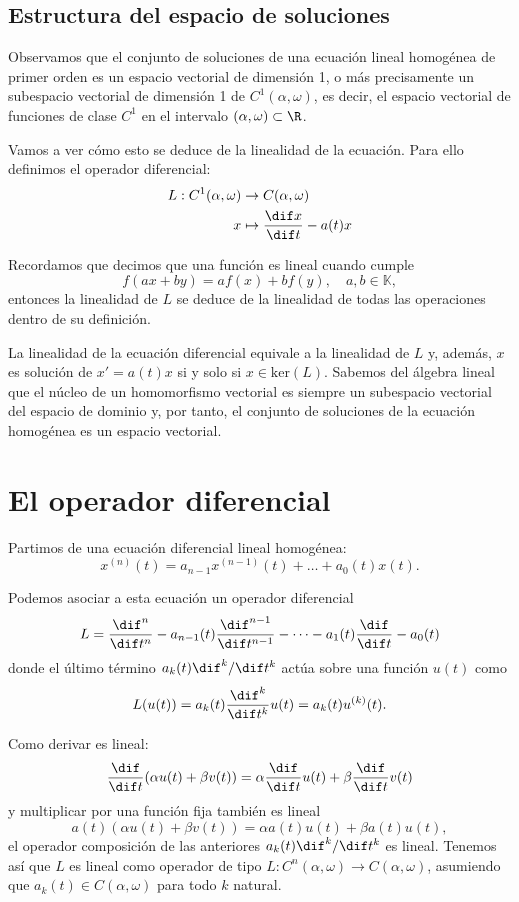 \documentclass[../main.tex]{subfiles}
\begin{document}
\subsection{Estructura del espacio de soluciones}

Observamos que el conjunto de soluciones de una ecuación lineal homogénea de
primer orden es un espacio vectorial de dimensión 1, o más precisamente un
subespacio vectorial de dimensión 1 de \(C^1(\alpha, \omega)\), es decir, el
espacio vectorial de funciones de clase \(C^1\) en el intervalo
\((\alpha, \omega) \subset \R\).

Vamos a ver cómo esto se deduce de la linealidad de la ecuación. Para ello
definimos el operador diferencial:
\begin{align*}
  L : C^1(\alpha, \omega) &\to C(\alpha, \omega) \\
  x &\mapsto \frac{\dif x}{\dif t} - a(t)x
\end{align*}

Recordamos que decimos que una función es lineal cuando cumple
\[f(ax + by) = af(x) + bf(y), \quad a, b \in \mathbb{K},\]
entonces la linealidad de \(L\) se deduce de la linealidad de todas las
operaciones dentro de su definición.

\begin{remark}
La linealidad de la ecuación diferencial equivale a la linealidad de
\(L\) y, además, \(x\) es solución de \(x' = a(t)x\) si y solo si
\(x \in \text{ker}(L)\). Sabemos del álgebra lineal que el núcleo de un
homomorfismo vectorial es siempre un subespacio vectorial del espacio de dominio
y, por tanto, el conjunto de soluciones de la ecuación homogénea es un espacio
vectorial.
\end{remark}

\section{El operador diferencial}

Partimos de una ecuación diferencial lineal homogénea:
\[x^{(n)}(t) = a_{n-1}x^{(n - 1)}(t) + \dots + a_0(t)x(t).\]

Podemos asociar a esta ecuación un operador diferencial
\[L = \frac{\dif^n}{\dif t^n} - a_{n-1}(t)\frac{\dif^{n-1}}{\dif t^{n-1}}
	- \dots - a_1(t)\frac{\dif}{\dif t} - a_0(t)\]
donde el último término \(a_k(t) \dif^k/\dif t^k\) actúa sobre una 
función \(u(t)\) como
\[L(u(t)) = a_k(t) \frac{\dif^k}{\dif t^k} u(t) = a_k(t) u^{(k)}(t).\]

Como derivar es lineal:
\[\frac{\dif}{\dif t} (\alpha u(t) + \beta v(t)) 
	= \alpha \frac{\dif}{\dif t} u(t) + \beta \frac{\dif}{\dif t} v(t)\]
y multiplicar por una función fija también es lineal
\[a(t)(\alpha u(t) + \beta v(t)) = \alpha a(t) u(t) + \beta a(t) u(t),\]
el operador composición de las anteriores \(a_k(t) \dif^k/\dif t^k\) es
lineal. Tenemos así que \(L\) es lineal como operador de tipo
\(L : C^n(\alpha, \omega) \to C(\alpha, \omega)\), asumiendo que
\(a_k(t) \in C(\alpha, \omega)\) para todo \(k\) natural.
\end{document}
